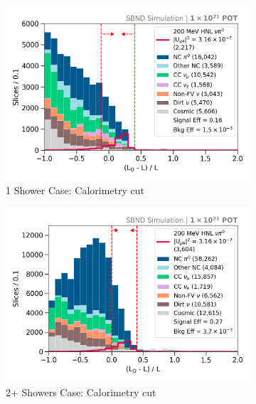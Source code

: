 \begin{figure}[hb!]
        \begin{subfigure}[b]{0.495\textwidth}   
            \centering 
            \includegraphics[width=\textwidth]{opt0frac_one_shw_precut}
            \caption{1 Shower Case: Calorimetry cut}%
        \end{subfigure}
        \hfill
        \begin{subfigure}[b]{0.495\textwidth}   
            \centering 
            \includegraphics[width=\textwidth]{opt0frac_two_shw_precut}
            \caption{2+ Showers Case: Calorimetry cut}%
        \end{subfigure}
        \hfill
	\centering
        \begin{subfigure}[b]{0.495\textwidth}   
            \centering 

\end{subfigure}
\end{figure}
